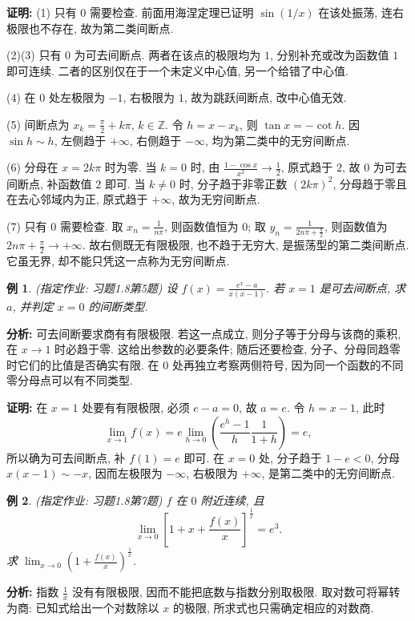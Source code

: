 \documentclass[UTF8,openany]{ctexbook}
\theoremstyle{chinesetextbook}
\newtheorem{example}{例}[section]
\newenvironment{cnproof}{\par\indent\textbf{证明:} \ignorespaces}{\par}
\begin{document}
\begin{cnproof}
(1) 只有 $0$ 需要检查. 前面用海涅定理已证明 $\sin(1/x)$ 在该处振荡, 连右极限也不存在, 故为第二类间断点.

(2)(3) 只有 $0$ 为可去间断点. 两者在该点的极限均为 $1$, 分别补充或改为函数值 $1$ 即可连续. 二者的区别仅在于一个未定义中心值, 另一个给错了中心值.

(4) 在 $0$ 处左极限为 $-1$, 右极限为 $1$, 故为跳跃间断点, 改中心值无效.

(5) 间断点为 $\displaystyle x_k=\frac\pi2+k\pi$, $k\in\mathbb Z$. 令 $h=x-x_k$, 则 $\tan x=-\cot h$. 因 $\sin h\sim h$, 左侧趋于 $+\infty$, 右侧趋于 $-\infty$, 均为第二类中的无穷间断点.

(6) 分母在 $x=2k\pi$ 时为零. 当 $k=0$ 时, 由 $\displaystyle\frac{1-\cos x}{x^2}\to\frac12$, 原式趋于 $2$, 故 $0$ 为可去间断点, 补函数值 $2$ 即可. 当 $k\ne0$ 时, 分子趋于非零正数 $(2k\pi)^2$, 分母趋于零且在去心邻域内为正, 原式趋于 $+\infty$, 故为无穷间断点.

(7) 只有 $0$ 需要检查. 取 $\displaystyle x_n=\frac1{n\pi}$, 则函数值恒为 $0$; 取 $\displaystyle y_n=\frac1{2n\pi+\frac\pi2}$, 则函数值为 $\displaystyle2n\pi+\frac\pi2\to+\infty$. 故右侧既无有限极限, 也不趋于无穷大, 是振荡型的第二类间断点. 它虽无界, 却不能只凭这一点称为无穷间断点.
\end{cnproof}
\begin{example}
(指定作业: 习题1.8第5题) 设 $\displaystyle f(x)=\frac{e^x-a}{x(x-1)}$. 若 $x=1$ 是可去间断点, 求 $a$, 并判定 $x=0$ 的间断类型.
\end{example}
\par\indent\textbf{分析:} 可去间断要求商有有限极限. 若这一点成立, 则分子等于分母与该商的乘积, 在 $x\to1$ 时必趋于零. 这给出参数的必要条件; 随后还要检查, 分子、分母同趋零时它们的比值是否确实有限. 在 $0$ 处再独立考察两侧符号, 因为同一个函数的不同零分母点可以有不同类型.
\begin{cnproof}
在 $x=1$ 处要有有限极限, 必须 $e-a=0$, 故 $a=e$. 令 $h=x-1$, 此时
\[
\lim_{x\to1}f(x)=e\lim_{h\to0}\left(\frac{e^h-1}h\frac1{1+h}\right)=e,
\]
所以确为可去间断点, 补 $f(1)=e$ 即可. 在 $x=0$ 处, 分子趋于 $1-e<0$, 分母 $x(x-1)\sim-x$, 因而左极限为 $-\infty$, 右极限为 $+\infty$, 是第二类中的无穷间断点.
\end{cnproof}
\begin{example}
(指定作业: 习题1.8第7题) $f$ 在 $0$ 附近连续, 且
\[
\lim_{x\to0}\left[1+x+\frac{f(x)}x\right]^{\frac1x}=e^3.
\]
求 $\displaystyle\lim_{x\to0}\left(1+\frac{f(x)}x\right)^{\frac1x}$.
\end{example}
\par\indent\textbf{分析:} 指数 $\displaystyle\frac1x$ 没有有限极限, 因而不能把底数与指数分别取极限. 取对数可将幂转为商: 已知式给出一个对数除以 $x$ 的极限, 所求式也只需确定相应的对数商.
\end{document}
